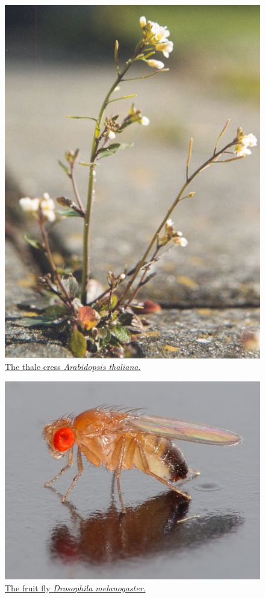 \begin{figure}

{\centering \includegraphics[width=0.7\linewidth]{./figures/genetics/Arabidopsis_thaliana} 

}

\caption{\href{https://commons.wikimedia.org/wiki/File:Arabidopsis_thaliana.jpg}{The thale cress \emph{Arabidopsis thaliana}.}}\label{fig:arabidopsisthaliana}
\end{figure}



\begin{figure}

{\centering \includegraphics[width=0.7\linewidth]{./figures/genetics/Drosophila_melanogaster_-_side_(aka)} 

}

\caption{\href{https://commons.wikimedia.org/wiki/File:Drosophila_melanogaster_-_side_(aka).jpg}{The fruit fly \emph{Drosophila melanogaster}.}}\label{fig:drosophilamelanogaster}
\end{figure}



